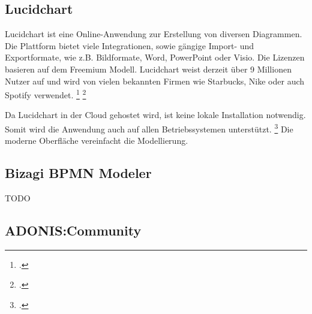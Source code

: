 \subsection{Lucidchart}
Lucidchart ist eine Online-Anwendung zur Erstellung von diversen Diagrammen. Die
Plattform bietet viele Integrationen, sowie gängige Import- und Exportformate,
wie z.B. Bildformate, Word, PowerPoint oder Visio. Die Lizenzen basieren
auf dem Freemium Modell. Lucidchart weist derzeit über 9 Millionen Nutzer auf
und wird von vielen bekannten Firmen wie Starbucks, Nike oder auch Spotify
verwendet. \footcite{lucidchart} \footcite{lucidchartpricing}

\begin{figure}[H]
\begin{minipage}{\linewidth}
\begin{center}
\end{center}
\end{minipage}
\end{figure}

Da Lucidchart in der Cloud gehostet wird, ist keine lokale Installation
notwendig. Somit wird die Anwendung auch auf allen Betriebssystemen unterstützt.
\footcite{lucidchart} Die moderne Oberfläche vereinfacht die Modellierung.


\subsection{Bizagi BPMN Modeler}
TODO
\subsection{ADONIS:Community}



